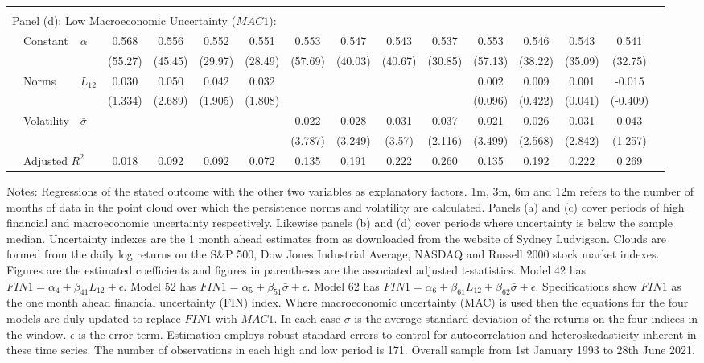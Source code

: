 \documentclass{article}
\begin{document}
\begin{sidewaystable}
\begin{center}
\begin{small}
\begin{tabular}{ll l c c c c c c c c c c c c c}
             &&&&&&&\\
             \multicolumn{9}{l}{Panel (d): Low Macroeconomic Uncertainty ($MAC1$): }\\
             & Constant & $\alpha$ & 0.568&0.556&0.552&0.551&0.553&0.547&0.543&0.537&0.553&0.546&0.543&0.541\\
             &&&(55.27)&(45.45)&(29.97)&(28.49)&(57.69)&(40.03)&(40.67)&(30.85)&(57.13)&(38.22)&(35.09)&(32.75)\\
             & Norms & $L_{12}$&0.030&0.050&0.042&0.032&&&&&0.002&0.009&0.001&-0.015\\
             &&&(1.334)&(2.689)&(1.905)&(1.808)&&&&&(0.096)&(0.422)&(0.041)&(-0.409)\\
             & Volatility & $\bar{\sigma}$&&&&&0.022&0.028&0.031&0.037&0.021&0.026&0.031&0.043\\
             &&&&&&&(3.787)&(3.249)&(3.57)&(2.116)&(3.499)&(2.568)&(2.842)&(1.257)\\
             & \multicolumn{2}{l}{Adjusted $R^2$}&0.018&0.092&0.092&0.072&0.135&0.191&0.222&0.260&0.135&0.192&0.222&0.269\\
             \hline
        \end{tabular}
        \end{small}
    \end{center}
\footnotesize{Notes: Regressions of the stated outcome with the other two variables as explanatory factors. 1m, 3m, 6m and 12m refers to the number of months of data in the point cloud over which the persistence norms and volatility are calculated. Panels (a) and (c) cover periods of high financial and macroeconomic uncertainty respectively. Likewise panels (b) and (d) cover periods where uncertainty is below the sample median. Uncertainty indexes are the 1 month ahead estimates from \cite{jurado2015measuring} as downloaded from the website of Sydney Ludvigson. Clouds are formed from the daily log returns on the S\&P 500, Dow Jones Industrial Average, NASDAQ and Russell 2000 stock market indexes. Figures are the estimated coefficients and figures in parentheses are the associated \cite{newey1987simple} adjusted t-statistics. Model 42 has $FIN1 = \alpha_4 + \beta_{41}L_{12} + \epsilon$. Model 52 has $FIN1 = \alpha_5 + \beta_{51}\bar{\sigma} + \epsilon$. Model 62 has $FIN1 = \alpha_6 + \beta_{61}L_{12} + \beta_{62}\bar{\sigma}+\epsilon$. Specifications show $FIN1$ as the one month ahead financial uncertainty (FIN) index. Where macroeconomic uncertainty (MAC) is used then the equations for the four models are duly updated to replace $FIN1$ with $MAC1$. In each case $\bar{\sigma}$ is the average standard deviation of the returns on the four indices in the window. $\epsilon$ is the error term. Estimation employs \cite{newey1987simple} robust standard errors to control for autocorrelation and heteroskedasticity inherent in these time series. The number of observations in each high and low period is 171. Overall sample from 1st January 1993 to 28th June 2021.}
\end{sidewaystable}
\end{document}
